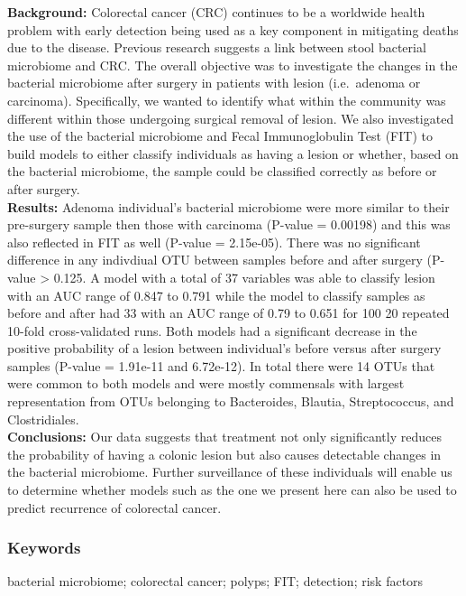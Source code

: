 \documentclass[12pt,]{article}
\begin{document}
\textbf{Background:} Colorectal cancer (CRC) continues to be a worldwide
health problem with early detection being used as a key component in
mitigating deaths due to the disease. Previous research suggests a link
between stool bacterial microbiome and CRC. The overall objective was to
investigate the changes in the bacterial microbiome after surgery in
patients with lesion (i.e.~adenoma or carcinoma). Specifically, we
wanted to identify what within the community was different within those
undergoing surgical removal of lesion. We also investigated the use of
the bacterial microbiome and Fecal Immunoglobulin Test (FIT) to build
models to either classify individuals as having a lesion or whether,
based on the bacterial microbiome, the sample could be classified
correctly as before or after surgery.\\
\textbf{Results:} Adenoma individual's bacterial microbiome were more
similar to their pre-surgery sample then those with carcinoma (P-value =
0.00198) and this was also reflected in FIT as well (P-value =
2.15e-05). There was no significant difference in any indivdiual OTU
between samples before and after surgery (P-value \textgreater{} 0.125.
A model with a total of 37 variables was able to classify lesion with an
AUC range of 0.847 to 0.791 while the model to classify samples as
before and after had 33 with an AUC range of 0.79 to 0.651 for 100 20
repeated 10-fold cross-validated runs. Both models had a significant
decrease in the positive probability of a lesion between individual's
before versus after surgery samples (P-value = 1.91e-11 and 6.72e-12).
In total there were 14 OTUs that were common to both models and were
mostly commensals with largest representation from OTUs belonging to
Bacteroides, Blautia, Streptococcus, and Clostridiales.\\
\textbf{Conclusions:} Our data suggests that treatment not only
significantly reduces the probability of having a colonic lesion but
also causes detectable changes in the bacterial microbiome. Further
surveillance of these individuals will enable us to determine whether
models such as the one we present here can also be used to predict
recurrence of colorectal cancer.

\newpage

\subsubsection{Keywords}\label{keywords}

bacterial microbiome; colorectal cancer; polyps; FIT; detection; risk
factors
\end{document}
